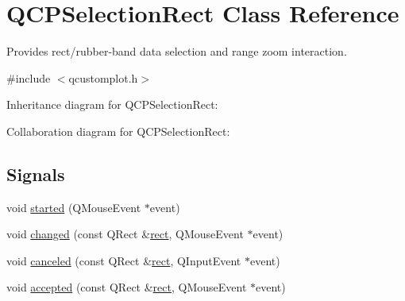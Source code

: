 \hypertarget{class_q_c_p_selection_rect}{}\section{Q\+C\+P\+Selection\+Rect Class Reference}
\label{class_q_c_p_selection_rect}


Provides rect/rubber-\/band data selection and range zoom interaction.  




{\ttfamily \#include $<$qcustomplot.\+h$>$}



Inheritance diagram for Q\+C\+P\+Selection\+Rect\+:


Collaboration diagram for Q\+C\+P\+Selection\+Rect\+:
\subsection*{Signals}
\begin{DoxyCompactItemize}
\item 
void \hyperlink{class_q_c_p_selection_rect_a7b7162d19f4f2174d3644ff1a5d335aa}{started} (Q\+Mouse\+Event $\ast$event)
\item 
void \hyperlink{class_q_c_p_selection_rect_a1bab11026bca52740c2e6682623e6964}{changed} (const Q\+Rect \&\hyperlink{class_q_c_p_selection_rect_a3812115ae4dfe2855bf1e58331c14805}{rect}, Q\+Mouse\+Event $\ast$event)
\item 
void \hyperlink{class_q_c_p_selection_rect_aeb82009393c90130102dccf36477b906}{canceled} (const Q\+Rect \&\hyperlink{class_q_c_p_selection_rect_a3812115ae4dfe2855bf1e58331c14805}{rect}, Q\+Input\+Event $\ast$event)
\item 
void \hyperlink{class_q_c_p_selection_rect_a15a43542e1f7b953a44c260b419e6d2c}{accepted} (const Q\+Rect \&\hyperlink{class_q_c_p_selection_rect_a3812115ae4dfe2855bf1e58331c14805}{rect}, Q\+Mouse\+Event $\ast$event)
\end{DoxyCompactItemize}
